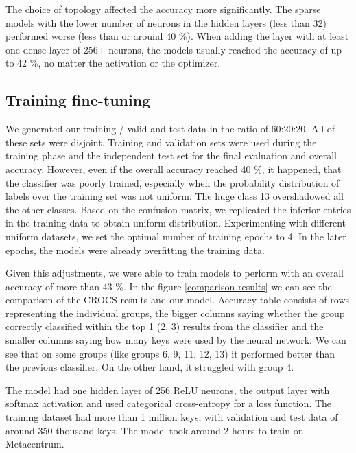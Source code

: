 The choice of topology affected the accuracy more significantly. The sparse models with the lower number of neurons in the hidden layers (less than 32) performed worse (less than or around 40 \%). When adding the layer with at least one dense layer of 256+ neurons, the models usually reached the accuracy of up to 42 \%, no matter the activation or the optimizer.

\subsection*{Training fine-tuning}

We generated our training / valid and test data in the ratio of 60:20:20. All of these sets were disjoint. Training and validation sets were used during the training phase and the independent test set for the final evaluation and overall accuracy. However, even if the overall accuracy reached 40 \%, it happened, that the classifier was poorly trained, especially when the probability distribution of labels over the training set was not uniform. The huge class 13 overshadowed all the other classes. Based on the confusion matrix, we replicated the inferior entries in the training data to obtain uniform distribution. Experimenting with different uniform datasets, we set the optimal number of training epochs to 4. In the later epochs, the models were already overfitting the training data.

Given this adjustments, we were able to train models to perform with an overall accuracy of more than 43 \%. In the figure \ref{comparison-results} we can see the comparison of the CROCS results and our model. Accuracy table consists of rows representing the individual groups, the bigger columns saying whether the group correctly classified within the top 1 (2, 3) results from the classifier and the smaller columns saying how many keys were used by the neural network. We can see that on some groups (like groups 6, 9, 11, 12, 13) it performed better than the previous classifier. On the other hand, it struggled with group 4.

The model had one hidden layer of 256 ReLU neurons, the output layer with softmax activation and used categorical cross-entropy for a loss function. The training dataset had more than 1 million keys, with validation and test data of around 350 thousand keys. The model took around 2 hours to train on Metacentrum.

